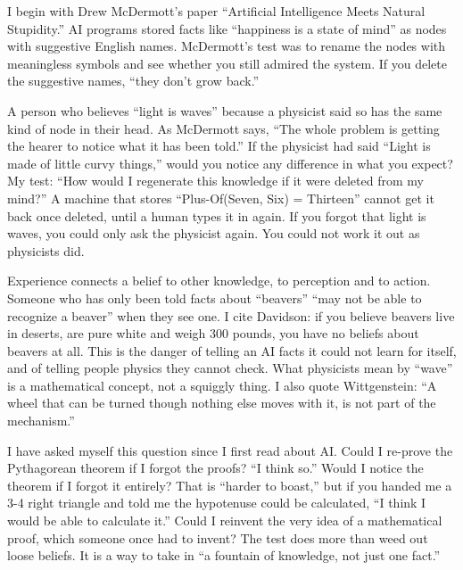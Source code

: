 
I begin with Drew McDermott's paper ``Artificial Intelligence Meets Natural Stupidity.'' AI programs stored facts like ``happiness is a state of mind'' as nodes with suggestive English names. McDermott's test was to rename the nodes with meaningless symbols and see whether you still admired the system. If you delete the suggestive names, ``they don't grow back.''

A person who believes ``light is waves'' because a physicist said so has the same kind of node in their head. As McDermott says, ``The whole problem is getting the hearer to notice what it has been told.''  If the physicist had said ``Light is made of little curvy things,'' would you notice any difference in what you expect? My test: ``How would I regenerate this knowledge if it were deleted from my mind?'' A machine that stores ``Plus-Of(Seven, Six) = Thirteen'' cannot get it back once deleted, until a human types it in again. If you forgot that light is waves, you could only ask the physicist again. You could not work it out as physicists did.

Experience connects a belief to other knowledge, to perception and to action. Someone who has only been told facts about ``beavers'' ``may not be able to recognize a beaver'' when they see one. I cite Davidson: if you believe beavers live in deserts, are pure white and weigh 300 pounds, you have no beliefs about beavers at all.  This is the danger of telling an AI facts it could not learn for itself, and of telling people physics they cannot check. What physicists mean by ``wave'' is a mathematical concept, not a squiggly thing. I also quote Wittgenstein: ``A wheel that can be turned though nothing else moves with it, is not part of the mechanism.'' 

I have asked myself this question since I first read about AI. Could I re-prove the Pythagorean theorem if I forgot the proofs? ``I think so.'' Would I notice the theorem if I forgot it entirely? That is ``harder to boast,'' but if you handed me a 3-4 right triangle and told me the hypotenuse could be calculated, ``I think I would be able to calculate it.''  Could I reinvent the very idea of a mathematical proof, which someone once had to invent? The test does more than weed out loose beliefs. It is a way to take in ``a fountain of knowledge, not just one fact.''

